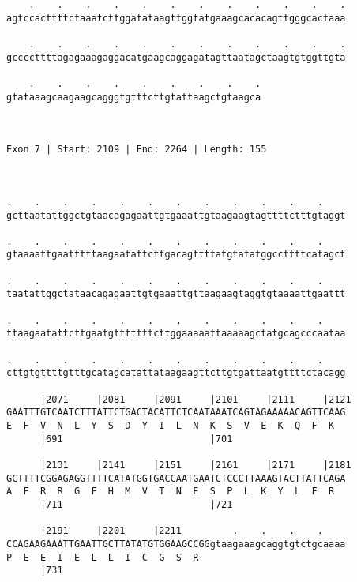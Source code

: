 \documentclass{article}
\begin{document}
\begin{Verbatim}
    .    .    .    .    .    .    .    .    .    .    .    .
agtccacttttctaaatcttggatataagttggtatgaaagcacacagttgggcactaaa
                                                            
    .    .    .    .    .    .    .    .    .    .    .    .
gccccttttagagaaagaggacatgaagcaggagatagttaatagctaagtgtggttgta
                                                            
    .    .    .    .    .    .    .    .    .
gtataaagcaagaagcagggtgtttcttgtattaagctgtaagca
                                             
                                             
 
Exon 7 | Start: 2109 | End: 2264 | Length: 155



.    .    .    .    .    .    .    .    .    .    .    .    
gcttaatattggctgtaacagagaattgtgaaattgtaagaagtagttttctttgtaggt
                                                            
.    .    .    .    .    .    .    .    .    .    .    .    
gtaaaattgaatttttaagaatattcttgacagttttatgtatatggccttttcatagct
                                                            
.    .    .    .    .    .    .    .    .    .    .    .    
taatattggctataacagagaattgtgaaattgttaagaagtaggtgtaaaattgaattt
                                                            
.    .    .    .    .    .    .    .    .    .    .    .    
ttaagaatattcttgaatgtttttttcttggaaaaattaaaaagctatgcagcccaataa
                                                            
.    .    .    .    .    .    .    .    .    .    .    .    
cttgtgttttgtttgcatagcatattataagaagttcttgtgattaatgttttctacagg
                                                            
      |2071     |2081     |2091     |2101     |2111     |2121
GAATTTGTCAATCTTTATTCTGACTACATTCTCAATAAATCAGTAGAAAAACAGTTCAAG
E  F  V  N  L  Y  S  D  Y  I  L  N  K  S  V  E  K  Q  F  K  
      |691                          |701                    
  
      |2131     |2141     |2151     |2161     |2171     |2181
GCTTTTCGGAGAGGTTTTCATATGGTGACCAATGAATCTCCCTTAAAGTACTTATTCAGA
A  F  R  R  G  F  H  M  V  T  N  E  S  P  L  K  Y  L  F  R  
      |711                          |721                    
  
      |2191     |2201     |2211         .    .    .    .    
CCAGAAGAAATTGAATTGCTTATATGTGGAAGCCGGgtaagaaagcaggtgtctgcaaaa
P  E  E  I  E  L  L  I  C  G  S  R                          
      |731                                                  
  

\end{Verbatim}
\end{document}
